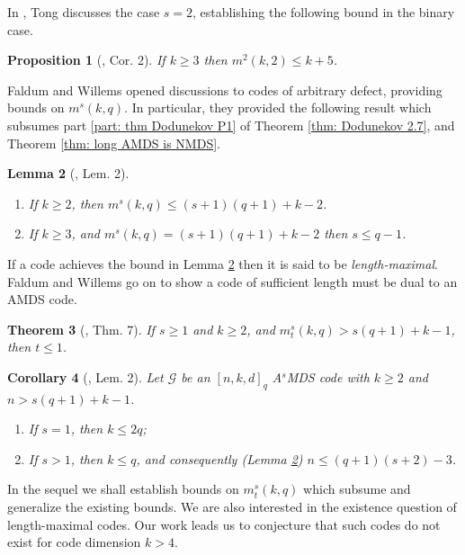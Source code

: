 \documentclass[11pt,a4paper]{amsart}
\newcommand{\G}{\mathcal{G}}
\theoremstyle{plain}
\newtheorem{theorem}{Theorem}[section]
\newtheorem{proposition}[theorem]{Proposition}
\newtheorem{lemma}[theorem]{Lemma}
\newtheorem{corollary}[theorem]{Corollary}
\theoremstyle{definition}
\theoremstyle{remark}
\begin{document}
	In \cite{Tong2012}, Tong discusses the case $s=2$, establishing the following bound in the binary case.

	\begin{proposition}[\cite{Tong2012}, Cor. 2]  \label{prop: Tong binary}
		If $k\ge 3$ then $m^2(k,2)\le k+5$.
	\end{proposition}

	Faldum and Willems \cite{MR1432708} opened discussions to codes of arbitrary defect, providing bounds on $m^s(k,q)$. In particular, they provided the following result which subsumes part \ref{part: thm Dodunekov P1} of Theorem \ref{thm: Dodunekov 2.7}, and Theorem \ref{thm: long AMDS is NMDS}.

	\begin{lemma}[\cite{MR1432708}, Lem. 2] \label{lem: long bound} \leavevmode \vspace*{-2mm}
		\begin{enumerate}
			\item If $k\ge 2$, then $m^s(k,q)\le (s+1)(q+1)+k-2$. \label{part: lem long bound P1}
			\item If $k\ge 3$, and $m^s(k,q) = (s+1)(q+1)+k-2$ then $s\le q-1$. \label{part: lem long bound P2}
		\end{enumerate}
	\end{lemma}

	If a code achieves the bound in Lemma \ref{lem: long bound} then it is said to be \textit{length-maximal}. Faldum and Willems go on to show a code of sufficient length must be dual to an AMDS code.
	\begin{theorem}[\cite{MR1432708}, Thm. 7] \label{long AsMDS dual to AMDS}
		If $s\ge 1$ and $k\ge 2$, and $m^s_t(k,q)>s(q+1)+k-1$, then $t\le 1$.
	\end{theorem}

	\begin{corollary}[\cite{MR1432708}, Lem. 2]\label{cor: FW-k-bounds} Let $\G$ be an $[n,k,d]_q$ A$^s$MDS code with $k\ge 2$ and $n>s(q+1)+k-1$.
		\begin{enumerate}
			\item If $s=1$, then $k\le 2q$;
			\item If $s>1$, then $k\le q$, and consequently (Lemma \ref{lem: long bound}) $n\le (q+1)(s+2)-3$.
		\end{enumerate}
	\end{corollary}

	In the sequel we shall establish bounds on $m^{s}_t(k,q)$ which subsume and generalize the existing bounds. We are also interested in the existence question of length-maximal codes. Our work  leads us to conjecture that such codes do not exist for code dimension $k>4$.
\end{document}
